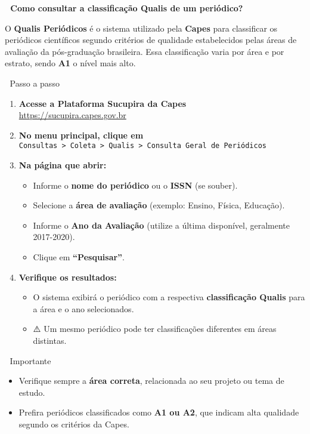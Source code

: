\documentclass[
  letterpaper,
  DIV=11,
  numbers=noendperiod]{scrreprt}
\providecommand{\tightlist}{%
  \setlength{\itemsep}{0pt}\setlength{\parskip}{0pt}}
\begin{document}
\textbf{🔎 Como consultar a classificação Qualis de um periódico?}

O \textbf{Qualis Periódicos} é o sistema utilizado pela \textbf{Capes}
para classificar os periódicos científicos segundo critérios de
qualidade estabelecidos pelas áreas de avaliação da pós-graduação
brasileira. Essa classificação varia por área e por estrato, sendo
\textbf{A1} o nível mais alto.

📝 Passo a passo

\begin{enumerate}
\def\labelenumi{\arabic{enumi}.}
\item
  \textbf{Acesse a Plataforma Sucupira da Capes}\\
  \url{https://sucupira.capes.gov.br}
\item
  \textbf{No menu principal, clique em}\\
  \texttt{Consultas\ \textgreater{}\ Coleta\ \textgreater{}\ Qualis\ \textgreater{}\ Consulta\ Geral\ de\ Periódicos}
\item
  \textbf{Na página que abrir:}

  \begin{itemize}
  \tightlist
  \item
    Informe o \textbf{nome do periódico} ou o \textbf{ISSN} (se souber).
  \item
    Selecione a \textbf{área de avaliação} (exemplo: Ensino, Física,
    Educação).
  \item
    Informe o \textbf{Ano da Avaliação} (utilize a última disponível,
    geralmente 2017-2020).
  \item
    Clique em \textbf{``Pesquisar''}.
  \end{itemize}
\item
  \textbf{Verifique os resultados:}

  \begin{itemize}
  \tightlist
  \item
    O sistema exibirá o periódico com a respectiva \textbf{classificação
    Qualis} para a área e o ano selecionados.
  \item
    ⚠️ Um mesmo periódico pode ter classificações diferentes em áreas
    distintas.
  \end{itemize}
\end{enumerate}

📌 Importante

\begin{itemize}
\tightlist
\item
  Verifique sempre a \textbf{área correta}, relacionada ao seu projeto
  ou tema de estudo.
\item
  Prefira periódicos classificados como \textbf{A1 ou A2}, que indicam
  alta qualidade segundo os critérios da Capes.
\end{itemize}
\end{document}
